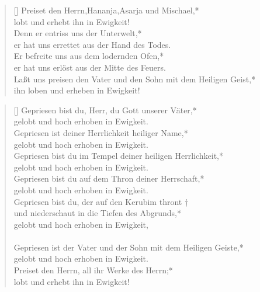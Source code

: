\begin{verse}[\versewidth]
\vin Preiset den Herrn,Hananja,Asarja und Mischael,*\\
\vin lobt und erhebt ihn in Ewigkeit!\\
Denn er entriss uns der Unterwelt,*\\
er hat uns errettet aus der Hand des Todes.\\
\vin Er befreite uns aus dem lodernden Ofen,*\\
\vin er hat uns erlöst aus der Mitte des Feuers.\\
Laßt uns preisen den Vater und den Sohn
mit dem Heiligen Geist,*\\
ihn loben und erheben in Ewigkeit!\\

\end{verse}





\def\greinitialformat#1{{\fontsize{40}{40}\selectfont #1}}
\gresetfirstlineaboveinitial{\small \textcolor{red}{Dan 3,52-57}}{}
\setaboveinitialseparation{0.72mm}





\begin{verse}[\versewidth]
 Gepriesen bist du, Herr, du Gott unserer Väter,*\\
gelobt und hoch erhoben in Ewigkeit.\\
\vin Gepriesen ist deiner Herrlichkeit heiliger Name,*\\
\vin gelobt und hoch erhoben in Ewigkeit.\\
Gepriesen bist du im Tempel deiner heiligen Herr\-lichkeit,*\\
gelobt und hoch erhoben in Ewigkeit.\\
\vin Gepriesen bist du auf dem Thron deiner Herrschaft,*\\
\vin gelobt und hoch erhoben in Ewigkeit.\\
Gepriesen bist du, der auf den Kerubim thront †\\
und niederschaut in die Tiefen des Abgrunds,*\\
gelobt und hoch erhoben in Ewigkeit,\\
\\
Gepriesen ist der Vater und der Sohn mit dem Heiligen Geiste,*\\
gelobt und hoch erhoben in Ewigkeit.\\

 \vin Preiset den Herrn, all ihr Werke des Herrn;*\\
 \vin lobt und erhebt ihn in Ewigkeit!\\

\end{verse}


